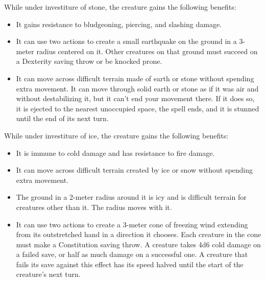         While under investiture of stone, the creature gains the following benefits:
        \begin{itemize}
            \item It gains resistance to bludgeoning, piercing, and slashing damage.
            \item It can use two actions to create a small earthquake on the ground in a 3-meter radius centered on it.
            Other creatures on that ground must succeed on a Dexterity saving throw or be knocked prone.
            \item It can move across difficult terrain made of earth or stone without spending extra movement.
            It can move through solid earth or stone as if it was air and without destabilizing it, but it can't end your movement there.
            If it does so, it is ejected to the nearest unoccupied space, the spell ends, and it is stunned until the end of its next turn.
        \end{itemize}

        While under investiture of ice, the creature gains the following benefits:
        \begin{itemize}
            \item It is immune to cold damage and has resistance to fire damage.
            \item It can move across difficult terrain created by ice or snow without spending extra movement.
            \item The ground in a 2-meter radius around it is icy and is difficult terrain for creatures other than it.
            The radius moves with it.
            \item It can use two actions to create a 3-meter cone of freezing wind extending from its outstretched hand in a direction it chooses.
            Each creature in the cone must make a Constitution saving throw.
            A creature takes 4d6 cold damage on a failed save, or half as much damage on a successful one.
            A creature that fails its save against this effect has its speed halved until the start of the creature's next turn.
        \end{itemize}

